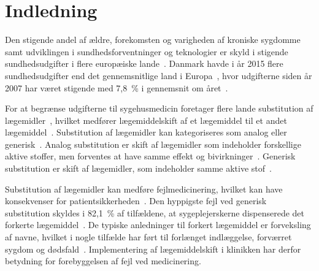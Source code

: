 \chapter{Indledning}
Den stigende andel af ældre, forekomsten og varigheden af kroniske sygdomme samt udviklingen i sundhedsforventninger og teknologier er skyld i stigende sundhedsudgifter i flere europæiske lande~\citep{Ess2003}. Danmark havde i år 2015 flere sundhedsudgifter end det gennemsnitlige land i Europa~\citep{EU2017}, hvor udgifterne siden år 2007 har været stigende med 7,8~\% i gennemsnit om året~\citep{Sundhed2016}.

For at begrænse udgifterne til sygehusmedicin foretager flere lande substitution af lægemidler~\citep{Ess2003,Johnston2011, Garcia2017}, hvilket medfører lægemiddelskift af et lægemiddel til et andet lægemiddel~\citep{DanskSelskabforPatientsikkerhed2009, Kairi2017}. %
Substitution af lægemidler kan kategoriseres som analog eller generisk~\citep{DanskSelskabforPatientsikkerhed2009}.  
Analog substitution er skift af lægemidler som indeholder forskellige aktive stoffer, men forventes at have samme effekt og bivirkninger~\citep{DanskSelskabforPatientsikkerhed2009,Kairi2017}. 
Generisk substitution er skift af lægemidler, som indeholder samme aktive stof~\citep{DanskSelskabforPatientsikkerhed2009,Kairi2017, Lopes2012}. 

Substitution af lægemidler kan medføre fejlmedicinering, hvilket kan have konsekvenser for patientsikkerheden~\citep{Hakonsen2010}. Den hyppigste fejl ved generisk substitution skyldes i 82,1~\% af tilfældene, at sygeplejerskerne dispenserede det forkerte lægemiddel~\citep{Hakonsen2010}. De typiske anledninger til forkert lægemiddel er forveksling af navne, hvilket i nogle tilfælde har ført til forlænget indlæggelse, forværret sygdom og dødsfald~\citep{DanskSelskabforPatientsikkerhed2009}. Implementering af lægemiddelskift i klinikken har derfor betydning for forebyggelsen af fejl ved medicinering.

